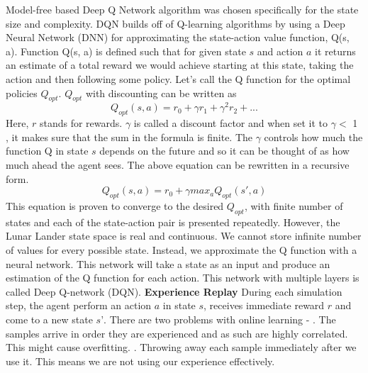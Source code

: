 Model-free based Deep Q Network algorithm was chosen specifically for the state size and complexity. DQN builds off of Q-learning algorithms by using a Deep Neural Network (DNN) for approximating the state-action value function, Q(s, a). Function Q(s, a) is defined such that for given state $s$ and action $a$ it returns an estimate of a total reward we would achieve starting at this state, taking the action and then following some policy. Let’s call the Q function for the optimal policies $Q_{opt}$.
 $Q_{opt}$ with discounting can be written as 
 \begin{equation}
Q_{opt}(s,a) = r_{0} + \gamma r_{1} + \gamma^{2} r_{2} + ...
\end{equation}
Here, $r$ stands for rewards. $\gamma$ is called a discount factor and when set it to $\gamma < $  1 , it makes sure that the sum in the formula is finite. The $\gamma$ controls how much the function Q in state $s$ depends on the future and so it can be thought of as how much ahead the agent sees.  \newline
The above equation can be rewritten in a recursive form.
 \begin{equation}
Q_{opt}(s,a) = r_{0} + \gamma max_{a}Q_{opt}(s',a)
\end{equation}
This equation is proven to converge to the desired $Q_{opt}$, with finite number of states and each of the state-action pair is presented repeatedly. However, the Lunar Lander state space is real and continuous. We cannot store infinite number of values for every possible state. Instead, we  approximate the Q function with a neural network. This network will take a state as an input and produce an estimation of the Q function for each action. This network with multiple layers is called Deep Q-network (DQN).
\newline \newline
\textbf{Experience Replay} \newline \newline
During each simulation step, the agent perform an action $a$ in state $s$, receives immediate reward $r$ and come to a new state $s’$.
\newline
There are two problems with online learning - . The samples arrive in order they are experienced and as such are highly correlated. This might cause overfitting.
. Throwing away each sample immediately after we use it. This means we are not using our experience effectively.
\newline
